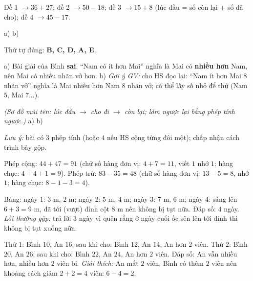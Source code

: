 \documentclass[../main.tex]{subfiles}
\begin{document}
 Đề 1 $\to36+27$; đề 2 $\to50-18$; đề 3 $\to15+8$ (lúc đầu = số còn lại + số đã cho); đề 4 $\to45-17$.

 a) 
b) 

 Thứ tự đúng: \textbf{B, C, D, A, E}.

 a) Bài giải của Bình \textbf{sai}. ``Nam có ít hơn Mai'' nghĩa là Mai có \textbf{nhiều hơn} Nam, nên Mai có nhiều nhãn vở hơn. b) 
\textit{Gợi ý GV:} cho HS đọc lại: ``Nam ít hơn Mai $8$ nhãn vở'' nghĩa là Mai nhiều hơn Nam $8$ nhãn vở; có thể lấy số nhỏ để thử (Nam $5$, Mai $7$...).

 \textit{(Sơ đồ mũi tên: lúc đầu $\to$ cho đi $\to$ còn lại; làm ngược lại bằng phép tính ngược.)} a) 
b) 

 

 
\textit{Lưu ý:} bài có $3$ phép tính (hoặc $4$ nếu HS cộng từng đôi một); chấp nhận cách trình bày gộp.

 

 Phép cộng: $44+47=91$ (chữ số hàng đơn vị: $4+7=11$, viết $1$ nhớ $1$; hàng chục: $4+4+1=9$). Phép trừ: $83-35=48$ (chữ số hàng đơn vị: $13-5=8$, nhớ $1$; hàng chục: $8-1-3=4$).

 Bảng: ngày 1: $3$ m, $2$ m; ngày 2: $5$ m, $4$ m; ngày 3: $7$ m, $6$ m; ngày 4: sáng lên $6+3=9$ m, đã tới (vượt) đỉnh cột $8$ m nên không bị tụt nữa. Đáp số: $4$ ngày. \textit{Lỗi thường gặp:} trả lời $3$ ngày vì quên rằng ở ngày cuối ốc sên lên tới đỉnh thì không bị tụt xuống nữa.

 Thử $1$: Bình $10$, An $16$; sau khi cho: Bình $12$, An $14$, An hơn $2$ viên. Thử $2$: Bình $20$, An $26$; sau khi cho: Bình $22$, An $24$, An hơn $2$ viên. Đáp số: An vẫn nhiều hơn, nhiều hơn $2$ viên bi. \textit{Giải thích:} An mất $2$ viên, Bình có thêm $2$ viên nên khoảng cách giảm $2+2=4$ viên: $6-4=2$.
\end{document}
